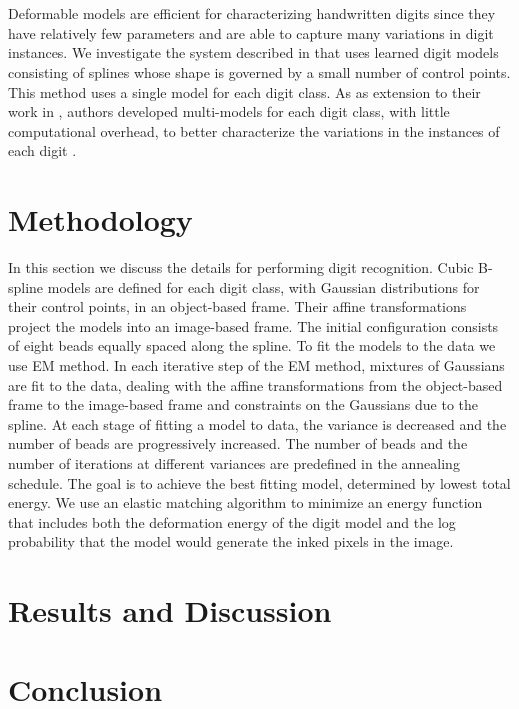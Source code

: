\documentclass[oribibl]{llncs}
\begin{document}
\\
\\
Deformable models are efficient for characterizing handwritten digits since they have
relatively few parameters and are able to capture many variations in digit instances. We investigate the system described in \cite{Hinton92adaptiveelastic} that uses learned digit models consisting of splines whose shape is governed by a small number of control points. This method uses a single model for each digit class. As as extension to their work in \cite{Hinton92adaptiveelastic}, authors developed multi-models for each digit class, with little computational overhead, to better characterize the variations in the instances of each digit \cite{revow1993using}. 


\section{Methodology}

In this section we discuss the details for performing digit recognition. Cubic B-spline models are defined for each digit class, with Gaussian distributions for their control points, in an object-based frame. Their affine transformations project the models into an image-based frame. The initial configuration consists of eight beads equally spaced along the spline. To fit the models to the data we use EM method. In each iterative step of the EM method, mixtures of Gaussians are fit to the data, dealing with the affine transformations from the object-based frame to the image-based frame and constraints on the Gaussians due to the spline. At each stage of fitting a model to data, the variance is decreased and the number of beads are progressively increased. The number of beads and the number of iterations at different variances are predefined in the annealing schedule. The goal is to achieve the best fitting model, determined by lowest total energy. We use an elastic matching algorithm to minimize an energy function that includes both the deformation energy of the digit model and the log probability that the model would generate the inked pixels in the image.


\section{Results and Discussion}

%
%

\section{Conclusion}

 

\end{document}
